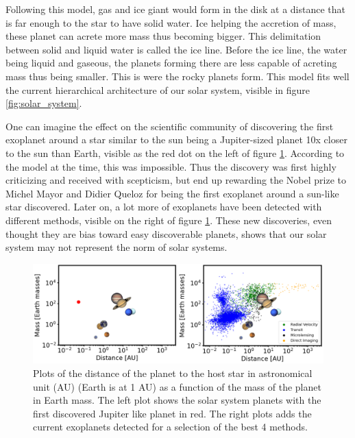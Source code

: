 \documentclass[a4paper, 11pt]{article}
\begin{document}
    Following this model, gas and ice giant would form in the disk at a distance that is far enough to the star to have solid water. Ice helping the accretion of mass, these planet can acrete more mass thus becoming bigger. This delimitation between solid and liquid water is called the ice line. Before the ice line, the water being liquid and gaseous, the planets forming there are less capable of acreting mass thus being smaller. This is were the rocky planets form. This model fits well the current hierarchical architecture of our solar system, visible in figure \ref{fig:solar_system}.
    
    
    
   	One can imagine the effect on the scientific community of discovering the first exoplanet around a star similar to the sun being a Jupiter-sized planet 10x closer to the sun than Earth, visible as the red dot on the left of figure \ref{fig:mass_distance_cropped}. According to the model at the time, this was impossible. Thus the discovery was first highly criticizing and received with scepticism, but end up rewarding the Nobel prize to Michel Mayor and Didier Queloz for being the first exoplanet around a sun-like star discovered. Later on, a lot more of exoplanets have been detected with different methods, visible on the right of figure \ref{fig:mass_distance_cropped}. These new discoveries, even thought they are bias toward easy discoverable planets, shows that our solar system may not represent the norm of solar systems.
   	  \begin{figure}[H]                                           
   		\centering \includegraphics[width=1\textwidth]{images/mass_distance_cropped.png}
   		\caption{Plots of the distance of the planet to the host star in astronomical unit (AU) (Earth is at 1 AU) as a function of the mass of the planet in Earth mass.  The left plot shows the solar system planets with the first discovered Jupiter like planet in red.  The right plots adds the current exoplanets detected for a selection of the best 4 methods.}
   		\label{fig:mass_distance_cropped}
   	\end{figure}
   	
\end{document}
